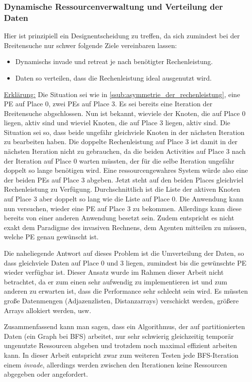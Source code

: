 \subsubsection{Dynamische Ressourcenverwaltung und Verteilung der Daten} %
\label{ssub:dynamische_ressourcenverwaltung}
Hier ist prinzipiell ein Designentscheidung zu treffen, da sich zumindest bei der Breitensuche nur schwer folgende Ziele vereinbaren lassen:
\begin{itemize}
	\item Dynamischs invade und retreat je nach benötigter Rechenleistung.
	\item Daten so verteilen, dass die Rechenleistung ideal ausgenutzt wird.
\end{itemize}
\underline{Erklärung:} Die Situation sei wie in \ref{ssub:asymmetrie_der_rechenleistung}, eine PE auf Place 0, zwei PEs auf Place 3. Es sei bereits eine Iteration der Breitensuche abgschlossen. Nun ist bekannt, wieviele der Knoten, die auf Place 0 liegen, aktiv sind und wieviel Knoten, die auf Place 3 liegen, aktiv sind. Die Situation sei so, dass beide ungefähr gleichviele Knoten in der nächsten Iteration zu bearbeiten haben. Die doppelte Rechenleistung auf Place 3 ist damit in der nächsten Iteration nicht zu gebrauchen, da die beiden Activities auf Place 3 nach der Iteration auf Place 0 warten müssten, der für die selbe Iteration ungefähr doppelt so lange benötigen wird. Eine ressourcengewahres System würde also eine der beiden PEs auf Place 3 abgeben. Jetzt steht auf den beiden Places gleichviel Rechenleistung zu Verfügung. Durchschnittlich ist die Liste der aktiven Knoten auf Place 3 aber doppelt so lang wie die Liste auf Place 0. Die Anwendung kann nun versuchen, wieder eine PE auf Place 3 zu bekommen. Allerdings kann diese bereits von einer anderen Anwendung besetzt sein. Zudem entspricht es nicht exakt dem Paradigme des invasiven Rechnens, dem Agenten mitteilen zu müssen, welche PE genau gewünscht ist.

Die naheliegende Antwort auf dieses Problem ist die Umverteilung der Daten, so dass gleichviele Daten auf Place 0 und 3 liegen, zumindest bis die gewünschte PE wieder verfügbar ist. Dieser Ansatz wurde im Rahmen dieser Arbeit nicht betrachtet, da er zum einen sehr aufwendig zu implementieren ist und zum anderen zu erwarten ist, dass die Performance sehr schlecht sein wird. Es müssten große Datenmengen (Adjazenzlisten, Distanzarrays) verschickt werden, größere Arrays allokiert werden, usw.

Zusammenfassend kann man sagen, dass ein Algorithmus, der auf partitionierten Daten (ein Graph bei BFS) arbeitet, nur sehr schwierig gleichzeitig temporär ungenutzte Ressourcen abgeben und trotzdem noch maximal effizient arbeiten kann. In dieser Arbeit entspricht zwar zum weiteren Testen jede BFS-Iteration einem \textit{invade}, allerdings werden zwischen den Iterationen keine Ressourcen abgegeben oder angefordert.
